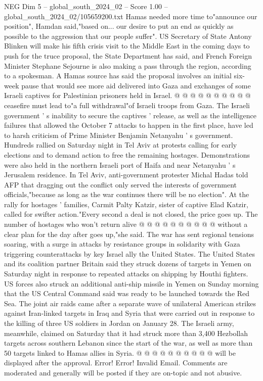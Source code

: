\begin{textsample}{NEG Dim 5 – global\_south\_2024\_02 – Score 1.00 – global\_south\_2024\_02/105659200.txt}
Hamas needed more time to"announce our position", Hamdan said,"based on... our desire to put an end as quickly as possible to the aggression that our people suffer".
US Secretary of State Antony Blinken will make his fifth crisis visit to the Middle East in the coming days to push for the truce proposal, the State Department has said, and French Foreign Minister Stephane Sejourne is also making a pass through the region, according to a spokesman.
A Hamas source has said the proposal involves an initial six-week pause that would see more aid delivered into Gaza and exchanges of some Israeli captives for Palestinian prisoners held in Israel. @ @ @ @ @ @ @ @ @ @ ceasefire must lead to"a full withdrawal"of Israeli troops from Gaza.
The Israeli government ' s inability to secure the captives ' release, as well as the intelligence failures that allowed the October 7 attacks to happen in the first place, have led to harsh criticism of Prime Minister Benjamin Netanyahu ' s government.
Hundreds rallied on Saturday night in Tel Aviv at protests calling for early elections and to demand action to free the remaining hostages.
Demonstrations were also held in the northern Israeli port of Haifa and near Netanyahu ' s Jerusalem residence.
In Tel Aviv, anti-government protester Michal Hadas told AFP that dragging out the conflict only served the interests of government officials,"because as long as the war continues there will be no election".
At the rally for hostages ' families, Carmit Palty Katzir, sister of captive Elad Katzir, called for swifter action."Every second a deal is not closed, the price goes up.
The number of hostages who won't return alive @ @ @ @ @ @ @ @ @ @ without a clear plan for the day after goes up,"she said.
The war has sent regional tensions soaring, with a surge in attacks by resistance groups in solidarity with Gaza triggering counterattacks by key Israel ally the United States.
The United States and its coalition partner Britain said they struck dozens of targets in Yemen on Saturday night in response to repeated attacks on shipping by Houthi fighters.
US forces also struck an additional anti-ship missile in Yemen on Sunday morning that the US Central Command said was ready to be launched towards the Red Sea.
The joint air raids came after a separate wave of unilateral American strikes against Iran-linked targets in Iraq and Syria that were carried out in response to the killing of three US soldiers in Jordan on January 28.
The Israeli army, meanwhile, claimed on Saturday that it had struck more than 3,400 Hezbollah targets across southern Lebanon since the start of the war, as well as more than 50 targets linked to Hamas allies in Syria. @ @ @ @ @ @ @ @ @ @ will be displayed after the approval.
Error!
Error!
Invalid Email.
Comments are moderated and generally will be posted if they are on-topic and not abusive.

\end{textsample}
